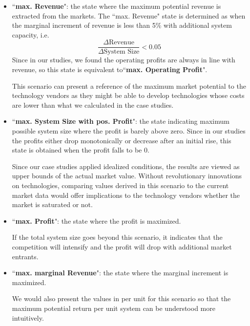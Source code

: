 \begin{itemize}
	\item ``\textbf{max. Revenue}": the state where the maximum potential revenue is extracted from the markets. The ``max. Revenue" state is determined as when the marginal increment of revenue is less than 5\% with additional system capacity, i.e. 
	\begin{equation*}
	\frac{\Delta\text{Revenue}}{\Delta\text{System Size}} < 0.05
	\end{equation*}
	Since in our studies, we found the operating profits are always in line with revenue, so this state is equivalent to``\textbf{max. Operating Profit}".
	
	This scenario can present a reference of the maximum market potential to the technology vendors as they might be able to develop technologies whose costs are lower than what we calculated in the case studies. 
	\item ``\textbf{max. System Size with pos. Profit}": the state indicating maximum possible system size where the profit is barely above zero. Since in our studies the profits either drop monotonically or decrease after an initial rise, this state is obtained when the profit falls to be 0.
	
	Since our case studies applied idealized conditions, the results are viewed as upper bounds of the actual market value. Without revolutionary innovations on technologies, comparing values derived in this scenario to the current market data would offer implications to the technology vendors whether the market is saturated or not.
	
	\item ``\textbf{max. Profit}": the state where the profit is maximized.
	
	If the total system size goes beyond this scenario, it indicates that the competition will intensify and the profit will drop with additional market entrants.
   
	\item ``\textbf{max. marginal Revenue}": the state where the marginal increment is maximized. 
	
	We would also present the values in per unit for this scenario so that the maximum potential return per unit system can be understood more intuitively.
	
\end{itemize}

